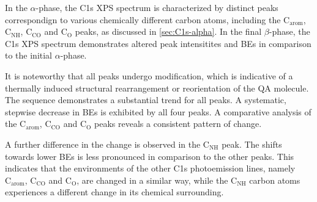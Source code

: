 In the $\alpha$-phase, the C1s \ac{XPS} spectrum is characterized by distinct peaks correspondign to various chemically different carbon atoms, including the $\mathrm{C_{arom}}$, $\mathrm{C_{NH}}$, $\mathrm{C_{CO}}$ and $\mathrm{C_{O}}$ peaks, as discussed in \autoref{sec:C1s-alpha}. In the final $\beta$-phase, the C1s \ac{XPS} spectrum demonstrates altered peak intensitites and \acp{BE} in comparison to the initial $\alpha$-phase.

It is noteworthy that all peaks undergo modification, which is indicative of a thermally induced structural rearrangement or reorientation of the \ac{QA} molecule. The sequence demonstrates a substantial trend for all peaks. A systematic, stepwise decrease in \acp{BE} is exhibited by all four peaks. A comparative analysis of the $\mathrm{C_{arom}}$, $\mathrm{C_{CO}}$ and $\mathrm{C_{O}}$ peaks reveals a consistent pattern of change.

A further difference in the change is observed in the $\mathrm{C_{NH}}$ peak. The shifts towards lower \acp{BE} is less pronounced in comparison to the other peaks. This indicates that the environments of the other C1s photoemission lines, namely $\mathrm{C_{arom}}$, $\mathrm{C_{CO}}$ and $\mathrm{C_{O}}$, are changed in a similar way, while the $\mathrm{C_{NH}}$ carbon atoms experiences a different change in its chemical surrounding.


